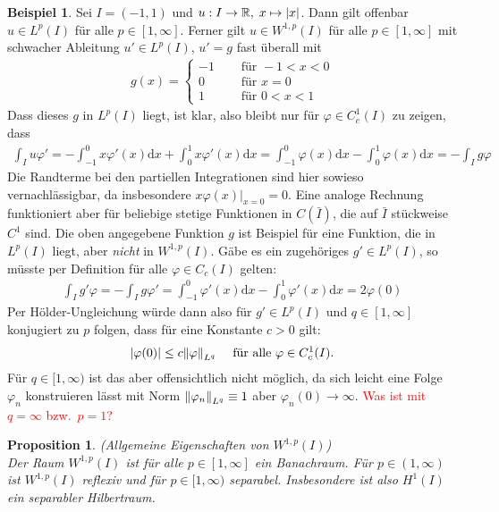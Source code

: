 \documentclass[twoside]{article}
\newtheorem{proposition}[theorem]{Proposition}
\theoremstyle{definition}
\newtheorem{example}[theorem]{Beispiel}
\begin{document}
\begin{example}
Sei $I = (-1,1)$ und $u : I \to \mathbb{R}, \; x \mapsto \abs{x}$. Dann gilt offenbar $u \in L^p(I)$ für alle $p \in [1,\infty]$. Ferner gilt $u \in W^{1,p}(I)$ für alle $p \in [1,\infty]$ mit schwacher Ableitung $u' \in L^p(I)$, $u' = g$ fast überall mit
\begin{align*}
g(x) = \begin{cases}
-1 &\quad \text{ für } -1<x<0\\
0 &\quad \text{ für } x = 0\\
1 &\quad \text{ für } 0<x<1
\end{cases}
\end{align*}
Dass dieses $g$ in $L^p(I)$ liegt, ist klar, also bleibt nur für $\varphi \in C_c^1(I)$ zu zeigen, dass 
\begin{align*}
\int_I u \varphi' = -\int_{-1}^0 x \varphi'(x) \mathrm{d}x + \int_0^1 x \varphi'(x) \mathrm{d}x = \int_{-1}^0 \varphi(x) \mathrm{d}x - \int_0^1 \varphi(x) \mathrm{d}x = -\int_I g \varphi
\end{align*}
Die Randterme bei den partiellen Integrationen sind hier sowieso vernachlässigbar, da insbesondere $x \varphi(x)|_{x=0} = 0$. Eine analoge Rechnung funktioniert aber für beliebige stetige Funktionen in $C(\bar{I})$, die auf $\bar{I}$ stückweise $C^1$ sind. Die oben angegebene Funktion $g$ ist Beispiel für eine Funktion, die in $L^p(I)$ liegt, aber \textit{nicht} in $W^{1,p}(I)$. Gäbe es ein zugehöriges $g' \in L^p(I)$, so müsste per Definition für alle $\varphi \in C_c(I)$ gelten:
\begin{align*}
\int_I g' \varphi = - \int_I g \varphi' = \int_{-1}^0 \varphi'(x) \mathrm{d}x - \int_0^1 \varphi'(x)\mathrm{d}x = 2 \varphi(0)
\end{align*}
Per Hölder-Ungleichung würde dann also für $g' \in L^p(I)$ und $q \in [1,\infty]$ konjugiert zu $p$ folgen, dass für eine Konstante $c > 0$ gilt:
\begin{align*}
\abs{\varphi(0)} \leq c \norm{\varphi}_{L^q} \quad \text{ für alle } \varphi \in C_c^1(I).
\end{align*}
Für $q \in [1,\infty)$ ist das aber offensichtlich nicht möglich, da sich leicht eine Folge $\varphi_n$ konstruieren lässt mit Norm $\norm{\varphi_n}_{L^q} \equiv 1$ aber $\varphi_n(0) \to \infty$. \textcolor{red}{Was ist mit $q=\infty$ bzw.\ $p=1$?}
\end{example}
\begin{proposition}(Allgemeine Eigenschaften von $W^{1,p}(I)$)\\
Der Raum $W^{1,p}(I)$ ist für alle $p \in [1,\infty]$ ein Banachraum. Für $p \in (1,\infty)$ ist $W^{1,p}(I)$ reflexiv und für $p \in [1,\infty)$ separabel. Insbesondere ist also $H^1(I)$ ein separabler Hilbertraum.
\end{proposition}
\end{document}
